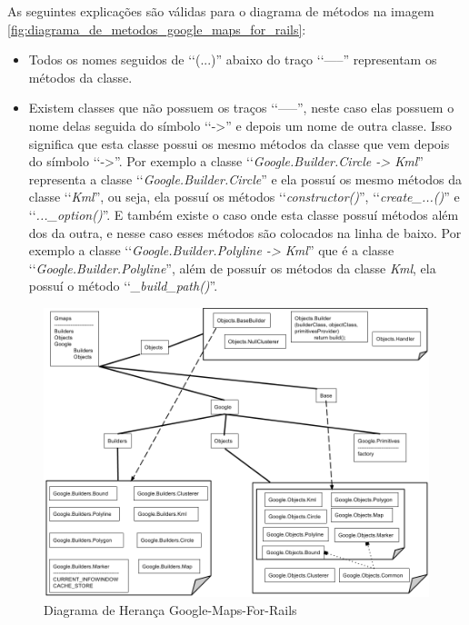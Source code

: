 As seguintes explicações são válidas para o diagrama de métodos na imagem
\ref{fig:diagrama_de_metodos_google_maps_for_rails}:

\begin{itemize}

 \item Todos os nomes seguidos de ‘‘(...)'' abaixo do traço ‘‘-----'' representam os métodos da classe.

 \item Existem classes que não possuem os traços ‘‘-----'', neste caso elas possuem o nome delas
 seguida do símbolo ‘‘->'' e depois um nome de outra classe. Isso significa que esta classe
 possui os mesmo métodos da classe que vem depois do símbolo ‘‘->''. Por exemplo a
 classe ‘‘\emph{Google.Builder.Circle -> Kml}'' representa a classe ‘‘\emph{Google.Builder.Circle}''
 e ela possuí os mesmo métodos da classe ‘‘\emph{Kml}'', ou seja, ela possuí os métodos
 ‘‘\emph{constructor()}'', ‘‘\emph{create\_...()}'' e ‘‘\emph{...\_option()}''. E também existe o caso
 onde esta classe possuí métodos além dos da outra, e nesse caso esses métodos são colocados na linha
 de baixo. Por exemplo a classe ‘‘\emph{Google.Builder.Polyline -> Kml}'' que é a classe
 ‘‘\emph{Google.Builder.Polyline}'', além de possuír os métodos da classe \emph{Kml}, ela
 possuí o método ‘‘\emph{\_build\_path()}''.

\end{itemize}


\begin{figure}[ht]
  \begin{center}
    \includegraphics[scale=0.35]{images/diagrama_de_heranca_google_maps_for_rails.png}
    \caption{Diagrama de Herança Google-Maps-For-Rails}
   \label{fig:diagrama_de_heranca_google_maps_for_rails}
  \end{center}
\end{figure}


